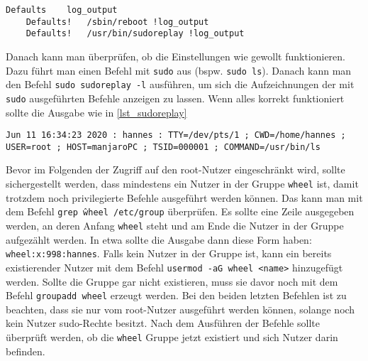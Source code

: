 \begin{lstlisting}[caption=/etc/sudoers, label=lst_visudo]
	Defaults    log_output
	Defaults!   /sbin/reboot !log_output
	Defaults!   /usr/bin/sudoreplay !log_output
\end{lstlisting}

Danach kann man überprüfen, ob die Einstellungen wie gewollt funktionieren. Dazu führt man einen Befehl mit \texttt{sudo} aus {\small(bspw. \texttt{sudo ls})}. Danach kann man den Befehl \texttt{sudo sudoreplay -l} ausführen, um sich die Aufzeichnungen der mit \texttt{sudo} ausgeführten Befehle anzeigen zu lassen. Wenn alles korrekt funktioniert sollte die Ausgabe wie in \ref{lst_sudoreplay}

\begin{lstlisting}[caption=sudoreplay Ausgabe, label=lst_sudoreplay]
	Jun 11 16:34:23 2020 : hannes : TTY=/dev/pts/1 ; CWD=/home/hannes ; USER=root ; HOST=manjaroPC ; TSID=000001 ; COMMAND=/usr/bin/ls
\end{lstlisting}

Bevor im Folgenden der Zugriff auf den root-Nutzer eingeschränkt wird, sollte sichergestellt werden, dass mindestens ein Nutzer in der Gruppe \texttt{wheel} ist, damit trotzdem noch privilegierte Befehle ausgeführt werden können. Das kann man mit dem Befehl \texttt{grep \^wheel /etc/group} überprüfen.\cite[S. 37]{GuideSecureConfiguration2011} Es sollte eine Zeile ausgegeben werden, an deren Anfang \texttt{wheel} steht und am Ende die Nutzer in der Gruppe aufgezählt werden. In etwa sollte die Ausgabe dann diese Form haben: \texttt{wheel:x:998:hannes}. Falls kein Nutzer in der Gruppe ist, kann ein bereits existierender Nutzer mit dem Befehl \texttt{usermod -aG wheel <name>} hinzugefügt werden. Sollte die Gruppe gar nicht existieren, muss sie davor noch mit dem Befehl \texttt{groupadd wheel} erzeugt werden. Bei den beiden letzten Befehlen ist zu beachten, dass sie nur vom root-Nutzer ausgeführt werden können, solange noch kein Nutzer sudo-Rechte besitzt. Nach dem Ausführen der Befehle sollte überprüft werden, ob die \texttt{wheel} Gruppe jetzt existiert und sich Nutzer darin befinden.

